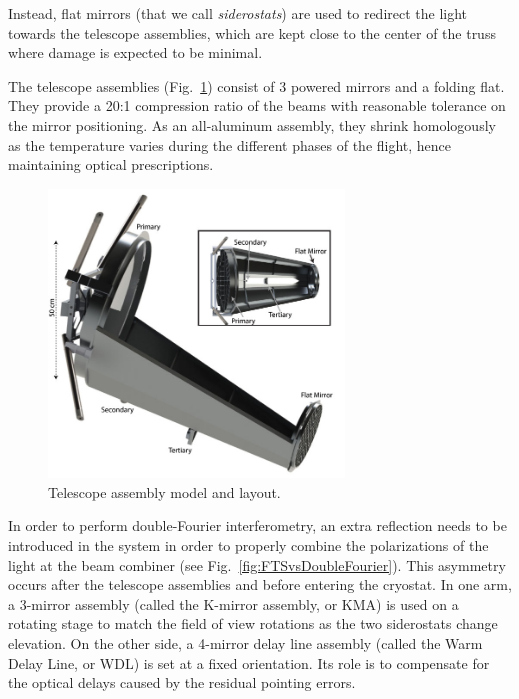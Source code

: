 Instead, flat mirrors (that we call \textit{siderostats}) are used to redirect the light towards the telescope assemblies, which are kept close to the center of the truss where damage is expected to be minimal. 

The telescope assemblies (Fig.~\ref{fig:TelescopeAssemblyLayout}) consist of 3 powered mirrors and a folding flat. They provide a 20:1 compression ratio of the beams with reasonable tolerance on the mirror positioning. As an all-aluminum assembly, they shrink homologously as the temperature varies during the different phases of the flight, hence maintaining optical prescriptions. 

\begin{figure}[!h]
		\centering
		\includegraphics[width=0.7\textwidth]{Figures/TelescopeAssembly.jpg} 
		\caption[Telescope assembly layout]{Telescope assembly model and layout.}
		\label{fig:TelescopeAssemblyLayout}
\end{figure}


In order to perform double-Fourier interferometry, an extra reflection needs to be introduced in the system in order to properly combine the polarizations of the light at the beam combiner (see Fig.~\ref{fig:FTSvsDoubleFourier}). This asymmetry occurs after the telescope assemblies and before entering the cryostat. In one arm, a 3-mirror assembly (called the K-mirror assembly, or KMA) is used on a rotating stage to match the field of view rotations as the two siderostats change elevation. On the other side, a 4-mirror delay line assembly (called the Warm Delay Line, or WDL) is set at a fixed orientation. Its role is to compensate for the optical delays caused by the residual pointing errors. 


